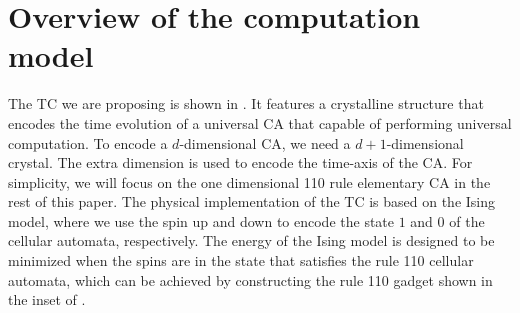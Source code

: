 \documentclass[twocolumn,superscriptaddress,english,showpacs,longbibliography]{revtex4-2}
\begin{document}






\section{Overview of the computation model}\label{sec:Overview-of-main-results}
The TC we are proposing is shown in . It features a crystalline structure that encodes the time evolution of a universal CA that capable of performing universal computation.
To encode a $d$-dimensional CA, we need a $d+1$-dimensional crystal. The extra dimension is used to encode the time-axis of the CA.
For simplicity, we will focus on the one dimensional 110 rule elementary CA in the rest of this paper.
The physical implementation of the TC is based on the Ising model, where we use the spin up and down to encode the state $1$ and $0$ of the cellular automata, respectively. The energy of the Ising model is designed to be minimized when the spins are in the state that satisfies the rule 110 cellular automata, which can be achieved by constructing the rule 110 gadget shown in the inset of .
\end{document}
